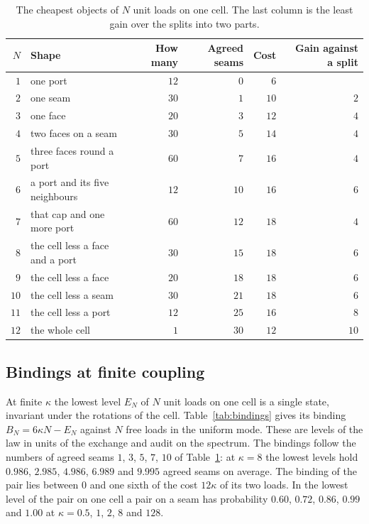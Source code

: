 \documentclass[11pt]{article}
\theoremstyle{definition}
\theoremstyle{remark}
\theoremstyle{plain}
\begin{document}
\begin{table}[!htb]
\centering
\caption{The cheapest objects of $N$ unit loads on one cell. The last
column is the least gain over the splits into two parts.}
\label{tab:objects}
\small
\begin{tabular}{@{}rlrrrr@{}}
\toprule
$N$ & Shape & How many & Agreed seams & Cost & Gain against a split \\
\midrule
$1$ & one port & $12$ & $0$ & $6$ & \\
$2$ & one seam & $30$ & $1$ & $10$ & $2$ \\
$3$ & one face & $20$ & $3$ & $12$ & $4$ \\
$4$ & two faces on a seam & $30$ & $5$ & $14$ & $4$ \\
$5$ & three faces round a port & $60$ & $7$ & $16$ & $4$ \\
$6$ & a port and its five neighbours & $12$ & $10$ & $16$ & $6$ \\
$7$ & that cap and one more port & $60$ & $12$ & $18$ & $4$ \\
$8$ & the cell less a face and a port & $30$ & $15$ & $18$ & $6$ \\
$9$ & the cell less a face & $20$ & $18$ & $18$ & $6$ \\
$10$ & the cell less a seam & $30$ & $21$ & $18$ & $6$ \\
$11$ & the cell less a port & $12$ & $25$ & $16$ & $8$ \\
$12$ & the whole cell & $1$ & $30$ & $12$ & $10$ \\
\bottomrule
\end{tabular}
\end{table}

\subsection{Bindings at finite coupling}

At finite $\kappa$ the lowest level $E_N$ of $N$ unit loads on one cell is
a single state, invariant under the rotations of the cell.
Table~\ref{tab:bindings} gives its binding $B_N=6\kappa N-E_N$ against $N$
free loads in the uniform mode. These are levels of the law in units of the
exchange and audit on the spectrum. The bindings follow the numbers of
agreed seams $1$, $3$, $5$, $7$, $10$ of Table~\ref{tab:objects}: at
$\kappa=8$ the lowest levels hold $0.986$, $2.985$, $4.986$, $6.989$ and
$9.995$ agreed seams on average. The binding of the pair lies between $0$
and one sixth of the cost $12\kappa$ of its two loads. In the lowest level
of the pair on one cell a pair on a seam has probability $0.60$, $0.72$,
$0.86$, $0.99$ and $1.00$ at $\kappa=0.5$, $1$, $2$, $8$ and $128$.
\end{document}
